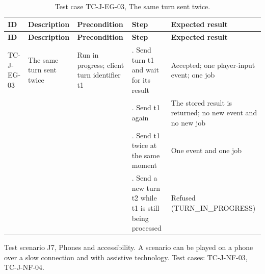 {\small
\begin{longtable}{|>{\raggedright\arraybackslash}p{}|>{\raggedright\arraybackslash}p{}|>{\raggedright\arraybackslash}p{}|>{\raggedright\arraybackslash}p{}|>{\raggedright\arraybackslash}p{}|}
\caption{Test case TC-J-EG-03, The same turn sent twice.} \\
\hline
\textbf{ID} & \textbf{Description} & \textbf{Precondition} & \textbf{Step} & \textbf{Expected result} \\ \hline
\endfirsthead
\hline
\textbf{ID} & \textbf{Description} & \textbf{Precondition} & \textbf{Step} & \textbf{Expected result} \\ \hline
\endhead
TC-J-EG-03 & The same turn sent twice & Run in progress; client turn identifier t1 & 1. Send turn t1 and wait for its result & Accepted; one player-input event; one job \\ \hline
 &  &  & 2. Send t1 again & The stored result is returned; no new event and no new job \\ \hline
 &  &  & 3. Send t1 twice at the same moment & One event and one job \\ \hline
 &  &  & 4. Send a new turn t2 while t1 is still being processed & Refused (TURN\_IN\_PROGRESS) \\ \hline
\end{longtable}
}

Test scenario J7, Phones and accessibility. A scenario can be played on a phone over a slow connection and with assistive technology. Test cases: TC-J-NF-03, TC-J-NF-04.

